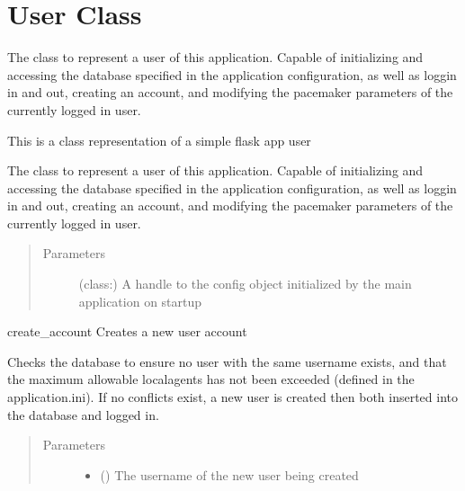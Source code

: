 \documentclass[letterpaper,10pt,english]{sphinxmanual}
\begin{document}
\section{User Class}
\label{\detokenize{index:user-class}}
The class to represent a user of this application.
Capable of initializing and accessing the database
specified in the application configuration, as well
as loggin in and out, creating an account, and
modifying the pacemaker parameters of the currently
logged in user.

\begin{fulllineitems}
\label{\detokenize{index:data.user.User}}
This is a class representation of a simple flask app user

The class to represent a user of this application.
Capable of initializing and accessing the database
specified in the application configuration, as well
as loggin in and out, creating an account, and
modifying the pacemaker parameters of the currently
logged in user.
\begin{quote}\begin{description}
\item[{Parameters}] \leavevmode
{} (class:) \textendash{} A handle to the  config
object initialized by the main application on startup

\end{description}\end{quote}

\begin{fulllineitems}
\label{\detokenize{index:data.user.User.create_account}}
create\_account Creates a new user account

Checks the database to ensure no user with the same username exists,
and that the maximum allowable local\sphinxhyphen{}agents has not been exceeded
(defined in the application.ini). If no conflicts exist, a new user
is created then both inserted into the database and logged in.
\begin{quote}\begin{description}
\item[{Parameters}] \leavevmode\begin{itemize}
\item {} 
 () \textendash{} The username of the new user being created


\end{itemize}
\end{description}
\end{quote}
\end{fulllineitems}
\end{fulllineitems}
\end{document}
